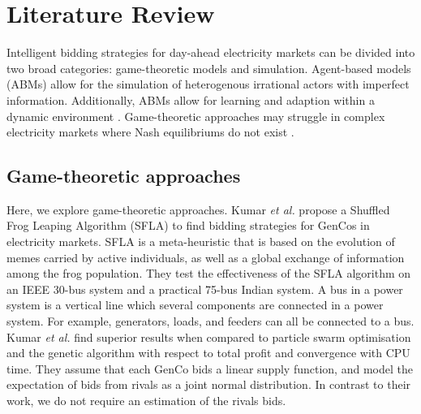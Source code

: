 









\section{Literature Review}
\label{rl:sec:lit-review}

Intelligent bidding strategies for day-ahead electricity markets can be divided into two broad categories: game-theoretic models and simulation. Agent-based models (ABMs) allow for the simulation of heterogenous irrational actors with imperfect information. Additionally, ABMs allow for learning and adaption within a dynamic environment \cite{EsmaeiliAliabadi2017}. Game-theoretic approaches may struggle in complex electricity markets where Nash equilibriums do not exist \cite{Wang2011}.

\subsection{Game-theoretic approaches}

Here, we explore game-theoretic approaches. Kumar \textit{et al.} propose a Shuffled Frog Leaping Algorithm (SFLA) \cite{VijayaKumar2014} to find bidding strategies for GenCos in electricity markets. SFLA is a meta-heuristic that is based on the evolution of memes carried by active individuals, as well as a global exchange of information among the frog population. They test the effectiveness of the SFLA algorithm on an IEEE 30-bus system and a practical 75-bus Indian system. A bus in a power system is a vertical line which several components are connected in a power system. For example, generators, loads, and feeders can all be connected to a bus. Kumar \textit{et al.} find superior results when compared to particle swarm optimisation and the genetic algorithm with respect to total profit and convergence with CPU time. They assume that each GenCo bids a linear supply function, and model the expectation of bids from rivals as a joint normal distribution. In contrast to their work, we do not require an estimation of the rivals bids.

